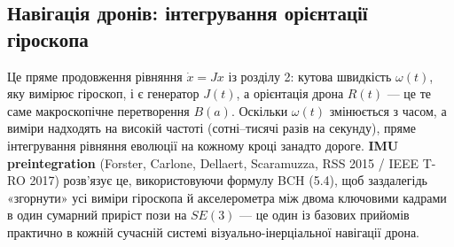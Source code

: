\documentclass[12pt, a4paper]{article}
\begin{document}
	\subsection{Навігація дронів: інтегрування орієнтації гіроскопа}
	Це пряме продовження рівняння $\dot x = Jx$ із розділу 2: кутова швидкість $\omega(t)$, яку вимірює гіроскоп, і є генератор $J(t)$, а орієнтація дрона $R(t)$ — це те саме макроскопічне перетворення $B(a)$. Оскільки $\omega(t)$ змінюється з часом, а виміри надходять на високій частоті (сотні--тисячі разів на секунду), пряме інтегрування рівняння еволюції на кожному кроці занадто дороге. \textbf{IMU preintegration} (Forster, Carlone, Dellaert, Scaramuzza, RSS 2015 / IEEE T-RO 2017) розв'язує це, використовуючи формулу BCH (5.4), щоб заздалегідь «згорнути» усі виміри гіроскопа й акселерометра між двома ключовими кадрами в один сумарний приріст пози на $SE(3)$ — це один із базових прийомів практично в кожній сучасній системі візуально-інерціальної навігації дрона.
	
\end{document}
